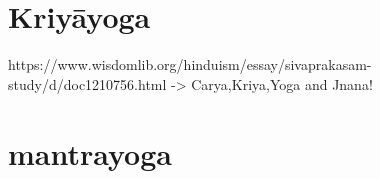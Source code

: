 {%
%
%
%
%
%
%

\section{Kriyāyoga}




https://www.wisdomlib.org/hinduism/essay/sivaprakasam-study/d/doc1210756.html
-> Carya,Kriya,Yoga and Jnana! 

\section{mantrayoga}

}
